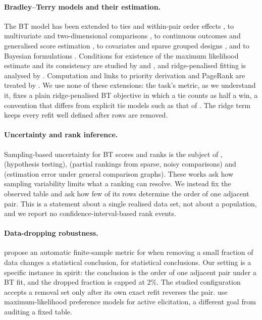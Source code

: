 \documentclass{article}
\begin{document}
\paragraph{Bradley--Terry models and their estimation.} The BT model has been extended to ties and within-pair order effects \citep{Davidson1970OnET,Davidson1977OnET}, to multivariate and two-dimensional comparisons \citep{Davidson1969MultivariatePC,Causeur2005A2E}, to continuous outcomes and generalised score estimation \citep{Stern2011ModeratedPC,Fageot2023GeneralizedBM}, to covariates and sparse grouped designs \citep{Yan2025InferenceIA,Yan2011GROUPEDSP}, and to Bayesian formulations \citep{Leonard1977AnAB,Hussain2013BayesianIO,Rizvi2026BayesianBF}. Conditions for existence of the maximum likelihood estimate and its consistency are studied by \citet{Butler2004TheEO} and \citet{Bong2021GeneralizedRF}, and ridge-penalised fitting is analysed by \citet{Varin2024TractableRR}. Computation and links to priority derivation and PageRank are treated by \citet{Vojnović2019ConvergenceRO,Sawadogo2019CombiningMA,Genest1999DerivingPF,Selby2024PageRankAT}. We use none of these extensions: the task's metric, as we understand it, fixes a plain ridge-penalised BT objective in which a tie counts as half a win, a convention that differs from explicit tie models such as that of \citet{Davidson1970OnET}. The ridge term keeps every refit well defined after rows are removed.

\paragraph{Uncertainty and rank inference.} Sampling-based uncertainty for BT scores and ranks is the subject of \citet{Gao2021UncertaintyQI}, \citet{Makur2024MinimaxHT} (hypothesis testing), \citet{Morel-Balbi2025EstimationOP} (partial rankings from sparse, noisy comparisons) and \citet{Li2021ThePO} (estimation error under general comparison graphs). These works ask how sampling variability limits what a ranking can resolve. We instead fix the observed table and ask how few of its rows determine the order of one adjacent pair. This is a statement about a single realised data set, not about a population, and we report no confidence-interval-based rank events.

\paragraph{Data-dropping robustness.} \citet{Broderick2020AnAF} propose an automatic finite-sample metric for when removing a small fraction of data changes a statistical conclusion, for statistical conclusions. Our setting is a specific instance in spirit: the conclusion is the order of one adjacent pair under a BT fit, and the dropped fraction is capped at $2\%$. The studied configuration accepts a removal set only after its own exact refit reverses the pair. \citet{Defresne2025PreferenceEF} use maximum-likelihood preference models for active elicitation, a different goal from auditing a fixed table.
\end{document}
